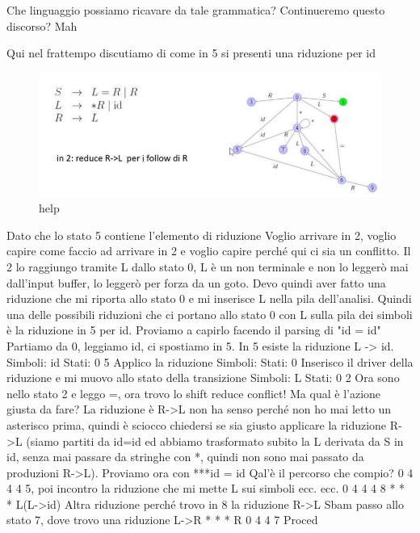 \documentclass[class=book, crop=false, oneside, 12pt]{standalone}
\begin{document}
Che linguaggio possiamo ricavare da tale grammatica?
Continueremo questo discorso? Mah

Qui nel frattempo discutiamo di come in 5 si presenti una riduzione per id
\begin{figure}[H]
    \centering
    \includegraphics[width=.8\textwidth]{send_help_6.png}
    \caption{help}
\end{figure}
Dato che lo stato 5 contiene l'elemento di riduzione
Voglio arrivare in 2, voglio capire come faccio ad arrivare in 2 e voglio capire perché qui ci sia un
conflitto.
Il 2 lo raggiungo tramite L dallo stato 0, L è un non terminale e non lo leggerò mai dall'input buffer, lo
leggerò per forza da un goto.
Devo quindi aver fatto una riduzione che mi riporta allo stato 0 e mi inserisce L nella pila dell'analisi.
Quindi una delle possibili riduzioni che ci portano allo stato 0 con L sulla pila dei simboli è la
riduzione in 5 per id.
Proviamo a capirlo facendo il parsing di "id = id"
Partiamo da 0, leggiamo id, ci spostiamo in 5.
In 5 esiste la riduzione L -> id.
Simboli: id
Stati: 0 5
Applico la riduzione
Simboli:
Stati: 0
Inserisco il driver della riduzione e mi muovo allo stato della transizione
Simboli: L
Stati: 0 2
Ora sono nello stato 2 e leggo =, ora trovo lo shift reduce conflict!
Ma qual è l'azione giusta da fare?
La riduzione è R->L non ha senso perché non ho mai letto un asterisco prima, quindi è sciocco
chiedersi se sia giusto applicare la riduzione R->L (siamo partiti da id=id ed abbiamo trasformato
subito la L derivata da S in id, senza mai passare da stringhe con *, quindi non sono mai passato da
produzioni R->L).
Proviamo ora con ***id = id
Qal'è il percorso che compio?
0 4 4 4 5, poi incontro la riduzione che mi mette L sui simboli ecc. ecc.
0 4 4 4 8
 * * * L(L->id)
Altra riduzione perché trovo in 8 la riduzione R->L
Sbam passo allo stato 7, dove
trovo una riduzione L->R
* * * R
0 4 4 7
Proced
\end{document}
